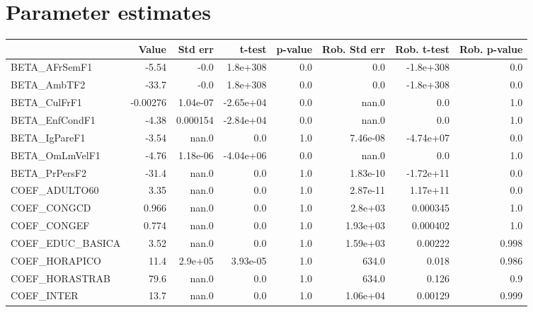 \section{Parameter estimates}
\begin{tabular}{lrrrrrrr}
\toprule
{} &    Value &   Std err &     t-test &  p-value &  Rob. Std err &  Rob. t-test &  Rob. p-value \\
\midrule
BETA\_AFrSemF1      &    -5.54 &      -0.0 &   1.8e+308 &      0.0 &           0.0 &    -1.8e+308 &           0.0 \\
BETA\_AmbTF2        &    -33.7 &      -0.0 &   1.8e+308 &      0.0 &           0.0 &    -1.8e+308 &           0.0 \\
BETA\_CulFrF1       & -0.00276 &  1.04e-07 &  -2.65e+04 &      0.0 &         nan.0 &          0.0 &           1.0 \\
BETA\_EnfCondF1     &    -4.38 &  0.000154 &  -2.84e+04 &      0.0 &         nan.0 &          0.0 &           1.0 \\
BETA\_IgPareF1      &    -3.54 &     nan.0 &        0.0 &      1.0 &      7.46e-08 &    -4.74e+07 &           0.0 \\
BETA\_OmLmVelF1     &    -4.76 &  1.18e-06 &  -4.04e+06 &      0.0 &         nan.0 &          0.0 &           1.0 \\
BETA\_PrPersF2      &    -31.4 &     nan.0 &        0.0 &      1.0 &      1.83e-10 &    -1.72e+11 &           0.0 \\
COEF\_ADULTO60      &     3.35 &     nan.0 &        0.0 &      1.0 &      2.87e-11 &     1.17e+11 &           0.0 \\
COEF\_CONGCD        &    0.966 &     nan.0 &        0.0 &      1.0 &       2.8e+03 &     0.000345 &           1.0 \\
COEF\_CONGEF        &    0.774 &     nan.0 &        0.0 &      1.0 &      1.93e+03 &     0.000402 &           1.0 \\
COEF\_EDUC\_BASICA   &     3.52 &     nan.0 &        0.0 &      1.0 &      1.59e+03 &      0.00222 &         0.998 \\
COEF\_HORAPICO      &     11.4 &   2.9e+05 &   3.93e-05 &      1.0 &         634.0 &        0.018 &         0.986 \\
COEF\_HORASTRAB     &     79.6 &     nan.0 &        0.0 &      1.0 &         634.0 &        0.126 &           0.9 \\
COEF\_INTER         &     13.7 &     nan.0 &        0.0 &      1.0 &      1.06e+04 &      0.00129 &         0.999 \\

\end{tabular}
